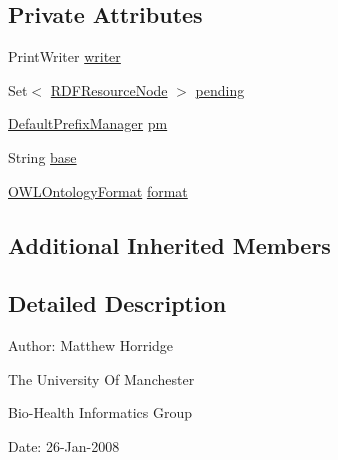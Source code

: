 \subsection*{Private Attributes}
\begin{DoxyCompactItemize}
\item 
Print\-Writer \hyperlink{classorg_1_1coode_1_1owlapi_1_1turtle_1_1_turtle_renderer_ada152bf6e16e8c3ecf222bc9da398f30}{writer}
\item 
Set$<$ \hyperlink{classorg_1_1coode_1_1owlapi_1_1rdf_1_1model_1_1_r_d_f_resource_node}{R\-D\-F\-Resource\-Node} $>$ \hyperlink{classorg_1_1coode_1_1owlapi_1_1turtle_1_1_turtle_renderer_a0e72e746c30fc0a7514db1477d7857d5}{pending}
\item 
\hyperlink{classorg_1_1semanticweb_1_1owlapi_1_1util_1_1_default_prefix_manager}{Default\-Prefix\-Manager} \hyperlink{classorg_1_1coode_1_1owlapi_1_1turtle_1_1_turtle_renderer_a3f6992dbdfc240559c9a1cecfc86e063}{pm}
\item 
String \hyperlink{classorg_1_1coode_1_1owlapi_1_1turtle_1_1_turtle_renderer_adaa90b82830a98e07241862f7481ecd8}{base}
\item 
\hyperlink{classorg_1_1semanticweb_1_1owlapi_1_1model_1_1_o_w_l_ontology_format}{O\-W\-L\-Ontology\-Format} \hyperlink{classorg_1_1coode_1_1owlapi_1_1turtle_1_1_turtle_renderer_a7c87ae8c5ff0f557fead87e1e456a7ce}{format}
\end{DoxyCompactItemize}
\subsection*{Additional Inherited Members}


\subsection{Detailed Description}
Author\-: Matthew Horridge\par
 The University Of Manchester\par
 Bio-\/\-Health Informatics Group\par
 Date\-: 26-\/\-Jan-\/2008\par
 \par
 

